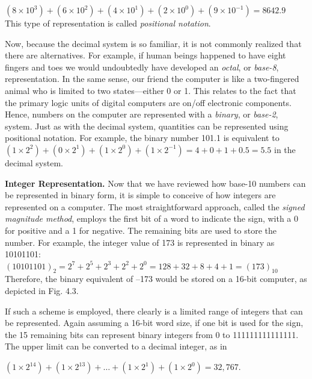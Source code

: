 \documentclass[../main.tex]{subfiles}
\begin{document}
$(8 \times 10^3) + (6 \times 10^2) + (4 \times 10^1) + (2 \times 10^0) + (9 \times 10^{−1}) = 8642.9$\\

\noindent
This type of representation is called \emph{positional notation}.

Now, because the decimal system is so familiar, it is not commonly realized that
there are alternatives. For example, if human beings happened to have eight fingers and
toes we would undoubtedly have developed an \emph{octal}, or \emph{base-8}, representation. In the
same sense, our friend the computer is like a two-fingered animal who is limited to two
states---either 0 or 1. This relates to the fact that the primary logic units of digital computers
are on/off electronic components. Hence, numbers on the computer are represented
with a \emph{binary}, or \emph{base-2}, system. Just as with the decimal system, quantities
can be represented using positional notation. For example, the binary number 101.1 is
equivalent to $(1 \times 2^2)+(0 \times 2^1) + (1 \times 2^0) + (1 \times 2^{−1}) = 4 + 0 + 1 + 0.5 = 5.5$ in the
decimal system.
\newpage

\noindent
\textbf{Integer Representation.}\quad
Now that we have reviewed how base-10 numbers can be represented
in binary form, it is simple to conceive of how integers are represented on a computer.
The most straightforward approach, called the \emph{signed magnitude method}, employs
the first bit of a word to indicate the sign, with a 0 for positive and a 1 for negative. The remaining
bits are used to store the number. For example, the integer value of 173 is represented
in binary as 10101101:\\

$(10101101)_2= 2^7 + 2^5 + 2^3 + 2^2 + 2^0 = 128 + 32 + 8 + 4 + 1 = (173)_{10}$\\

\noindent
Therefore, the binary equivalent of --173 would be stored on a 16-bit computer, as depicted
in Fig. 4.3.

If such a scheme is employed, there clearly is a limited range of integers that can be represented.
Again assuming a 16-bit word size, if one bit is used for the sign, the 15 remaining
bits can represent binary integers from 0 to 111111111111111. The upper limit can be converted
to a decimal integer, as in 

$(1 \times2^{14}) +(1 \times2^{13}) +\hdots +(1 \times2^{1}) +(1 \times2^{0}) = 32,767$.\\
\end{document}
